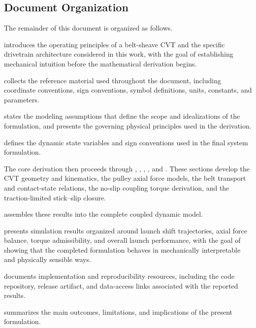 \documentclass[11pt]{article}
\numberwithin{equation}{section}
\newcounter{assump}
\begin{document}
\subsection{Document Organization}
\label{sec:intro_structure}

The remainder of this document is organized as follows.

 introduces the operating principles of a belt-sheave
CVT and the specific drivetrain architecture considered in this work, with the
goal of establishing mechanical intuition before the mathematical derivation
begins.

 collects the reference material used throughout the
document, including coordinate conventions, sign conventions, symbol
definitions, units, constants, and parameters.

 states the modeling assumptions that define the scope and
idealizations of the formulation, and  presents the
governing physical principles used in the derivation.

 defines the dynamic state variables and sign conventions used
in the final system formulation.

The core derivation then proceeds through ,
, ,
, and . These sections develop the
CVT geometry and kinematics, the pulley axial force models, the belt
transport and contact-state relations, the no-slip coupling torque
derivation, and the traction-limited stick--slip closure.

 assembles these results into the complete coupled
dynamic model.

 presents simulation results organized around launch shift
trajectories, axial force balance, torque admissibility, and overall launch
performance, with the goal of showing that the completed formulation behaves in
mechanically interpretable and physically sensible ways.

 documents implementation and reproducibility
resources, including the code repository, release artifact, and data-access
links associated with the reported results.

 summarizes the main outcomes, limitations, and
implications of the present formulation.
\end{document}
